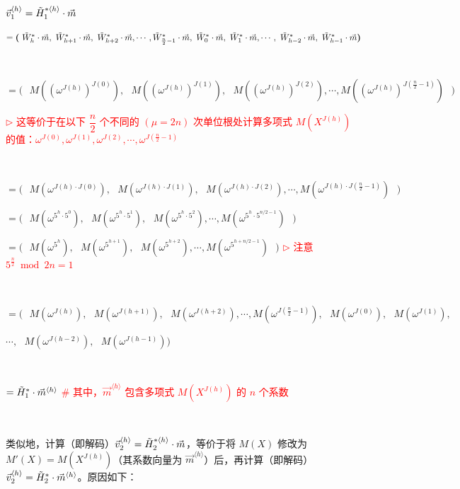 $\vec{v}_1^{\langle h \rangle} =\tilde{H}_1^{*\langle h \rangle}\cdot \vec{m}$

$ = \bm{(} \text{ } \tilde{W}^*_{h}\cdot\vec{m}, \text{ } \tilde{W}^*_{h+1}\cdot\vec{m}, \text{ } \tilde{W}^*_{h+2}\cdot\vec{m}, \cdots, \tilde{W}^*_{\frac{n}{2}-1}\cdot\vec{m}, \text{ } \tilde{W}^*_{0}\cdot\vec{m}, \text{ }\tilde{W}^*_{1}\cdot\vec{m}, \cdots, \text{ } \tilde{W}^*_{h-2}\cdot\vec{m}, \text{ } \tilde{W}^*_{h-1}\cdot\vec{m}  \bm{)}$

$ $

$= \bm{(} \text{ } M((\omega^{J(h)})^{J(0)}), \text{ } M((\omega^{J(h)})^{J(1)}), \text{ } M((\omega^{J(h)})^{J(2)}), \cdots, M((\omega^{J(h)})^{J(\frac{n}{2}-1)}) \text{ } \bm{)}$


\textcolor{red}{ $\rhd$ 这等价于在以下 $\dfrac{n}{2}$ 个不同的 $(\mu=2n)$ 次单位根处计算多项式 $M(X^{J(h)})$ 的值：$\omega^{J(0)}, \omega^{J(1)},  \omega^{J(2)}, \cdots, \omega^{J(\frac{n}{2} - 1)}$}

$ $

$= \bm{(} \text{ } M(\omega^{J(h)\cdot J(0)}), \text{ } M(\omega^{J(h)\cdot J(1)}), \text{ } M(\omega^{J(h)\cdot J(2)}), \cdots, M(\omega^{J(h)\cdot J(\frac{n}{2}-1)}) \text{ } \bm{)}$

$= \bm{(} \text{ } M(\omega^{5^h\cdot 5^0}), \text{ } M(\omega^{5^h\cdot 5^1}), \text{ } M(\omega^{5^h\cdot 5^2}), \cdots, M(\omega^{5^h\cdot 5^{n/2-1}}) \text{ } \bm{)}$

$= \bm{(} \text{ } M(\omega^{5^{h}}), \text{ } M(\omega^{5^{h+1}}), \text{ } M(\omega^{5^{h+2}}), \cdots, M(\omega^{5^{h+n/2-1}}) \text{ } \bm{)}$ \textcolor{red}{ $\rhd$ 注意 $5^{\frac{n}{2}} \bmod 2n = 1$}

$ $

$= \bm{(} \text{ } M(\omega^{J(h)}), \text{ } M(\omega^{J(h+1)}), \text{ } M(\omega^{J(h+2)}), \cdots, M(\omega^{J(\frac{n}{2}-1)}), \text{ } M(\omega^{J(0)}), \text{ }M(\omega^{J(1)}),$ 
                                    
$\cdots, \text{ } M(\omega^{J(h-2)}), \text{ } M(\omega^{J(h-1)})  \bm{)}$ 

$ $

$= \tilde{H}_1^{*}\cdot \vec{m}^{\langle h \rangle}$ \textcolor{red}{ \text{ } \# 其中，$\vec{m}^{\langle h \rangle}$ 包含多项式 $M(X^{J(h)})$ 的 $n$ 个系数 }


$ $

类似地，计算（即解码）$\vec{v}_2^{\langle h \rangle} = \tilde{H}_2^{*\langle h \rangle}\cdot \vec{m}$，等价于将 $M(X)$ 修改为 $M'(X) = M(X^{J(h)})$（其系数向量为 $\vec{m}^{\langle h \rangle}$）后，再计算（即解码）$\vec{v}_2^{\langle h \rangle} = \tilde{H}_2^{*}\cdot \vec{m}^{\langle h \rangle}$。原因如下：

